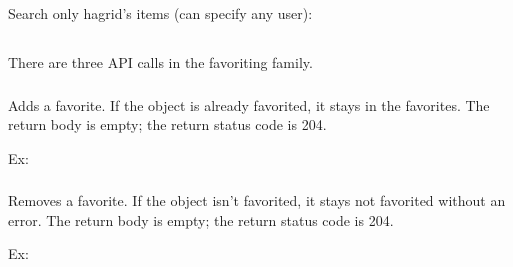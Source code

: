 \documentclass[onecolumn, draftclsnofoot, 10pt, compsoc]{IEEEtran}
\begin{document}
Search only hagrid's items (can specify any user):\mdbr
{}%

\subsection{}\label{sec-favorites}%

\noindent There are three API calls in the favoriting family.%

\subsubsection{}\label{sec-post-typeauthoridfavorite}%

\noindent Adds a favorite. If the object is already favorited, it stays in the favorites.
The return body is empty; the return status code is 204.%

Ex: %

\subsubsection{}\label{sec-delete-typeauthoridfavorite}%

\noindent Removes a favorite. If the object isn't favorited, it stays not favorited without an error.
The return body is empty; the return status code is 204.%

Ex: %

\subsubsection{}\label{sec-get-favorites}%
\end{document}
